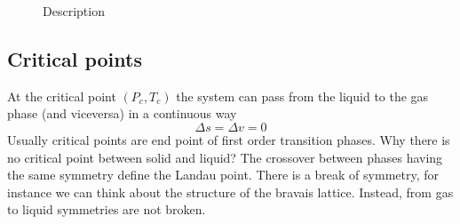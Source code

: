 \documentclass[../main/main.tex]{subfiles}
\begin{document}
\begin{figure}[h!]
\begin{minipage}[]{0.5\linewidth}
{

    \label{fig:2_8_2} }
\end{minipage}
\caption{\label{fig:2_8} Description}
\end{figure}



\subsection{Critical points}
At the critical point \( (P_c,T_c) \) the system can pass from the liquid to the gas phase (and viceversa) in a continuous way
\begin{equation}
  \Delta s = \Delta v = 0
  \label{eq:}
\end{equation}
Usually critical points are end point of first order transition phases. Why there is no critical point between solid and liquid? The crossover between phases having the same symmetry define the Landau point. There is a break of symmetry, for instance we can think about the structure of the bravais lattice. Instead, from gas to liquid symmetries are not broken.
\end{document}
